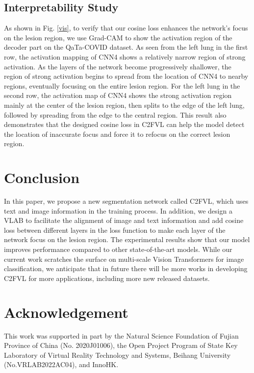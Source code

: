 \documentclass{article}
\begin{document}
\subsection{Interpretability Study}
\vspace{-3mm}
As shown in Fig. \ref{vis}, to verify that our cosine loss enhances the network's focus on the lesion region, we use Grad-CAM \cite{selvaraju2017grad} to show the activation region of the decoder part on the QaTa-COVID dataset. As seen from the left lung in the first row, the activation mapping of CNN4 shows a relatively narrow region of strong activation. As the layers of the network become progressively shallower, the region of strong activation begins to spread from the location of CNN4 to nearby regions, eventually focusing on the entire lesion region. For the left lung in the second row, the activation map of CNN4 shows the strong activation region mainly at the center of the lesion region, then splits to the edge of the left lung, followed by spreading from the edge to the central region. This result also demonstrates that the designed cosine loss in C2FVL can help the model detect the location of inaccurate focus and force it to refocus on the correct lesion region.
\vspace{-4mm}
\section{Conclusion}
\label{sec:conclusion}
\vspace{-3mm}
In this paper, we propose a new segmentation network called C2FVL, which uses text and image information in the training process. In addition, we design a VLAB to facilitate the alignment of image and text information and add cosine loss between different layers in the loss function to make each layer of the network focus on the lesion region. The experimental results show that our model improves performance compared to other state-of-the-art models. While our current work scratches the surface on multi-scale Vision Transformers for image classification, we anticipate that in future there will be more works in developing C2FVL for more applications, including more new released datasets.

\vspace{-2mm}
\section{Acknowledgement}
\vspace{-2mm}
This work was supported in part by the Natural Science Foundation of Fujian Province of China (No. 2020J01006), the Open Project Program of State Key Laboratory of Virtual Reality Technology and Systems, Beihang University (No.VRLAB2022AC04), and InnoHK. 





\vspace{-2mm}

\end{document}
